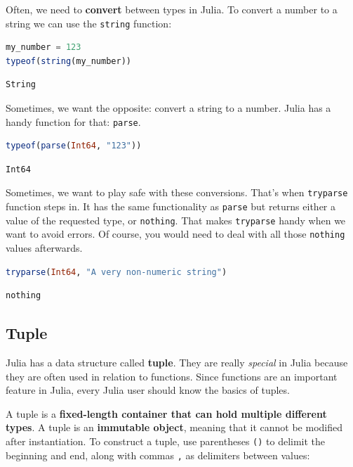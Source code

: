 \documentclass[
  notoc %
]{tufte-book}
\newcommand{\passthrough}[1]{#1}
\begin{document}
Often, we need to \textbf{convert} between types in Julia. To convert a
number to a string we can use the \passthrough{\lstinline!string!}
function:

\begin{lstlisting}[language=Julia]
my_number = 123
typeof(string(my_number))
\end{lstlisting}

\begin{lstlisting}[language=Output]
String
\end{lstlisting}

Sometimes, we want the opposite: convert a string to a number. Julia has
a handy function for that: \passthrough{\lstinline!parse!}.

\begin{lstlisting}[language=Julia]
typeof(parse(Int64, "123"))
\end{lstlisting}

\begin{lstlisting}[language=Output]
Int64
\end{lstlisting}

Sometimes, we want to play safe with these conversions. That's when
\passthrough{\lstinline!tryparse!} function steps in. It has the same
functionality as \passthrough{\lstinline!parse!} but returns either a
value of the requested type, or \passthrough{\lstinline!nothing!}. That
makes \passthrough{\lstinline!tryparse!} handy when we want to avoid
errors. Of course, you would need to deal with all those
\passthrough{\lstinline!nothing!} values afterwards.

\begin{lstlisting}[language=Julia]
tryparse(Int64, "A very non-numeric string")
\end{lstlisting}

\begin{lstlisting}[language=Output]
nothing
\end{lstlisting}

\hypertarget{sec:tuple}{%
\subsection{Tuple}\label{sec:tuple}}

Julia has a data structure called \textbf{tuple}. They are really
\emph{special} in Julia because they are often used in relation to
functions. Since functions are an important feature in Julia, every
Julia user should know the basics of tuples.

A tuple is a \textbf{fixed-length container that can hold multiple
different types}. A tuple is an \textbf{immutable object}, meaning that
it cannot be modified after instantiation. To construct a tuple, use
parentheses \passthrough{\lstinline!()!} to delimit the beginning and
end, along with commas \passthrough{\lstinline!,!} as delimiters between
values:
\end{document}
